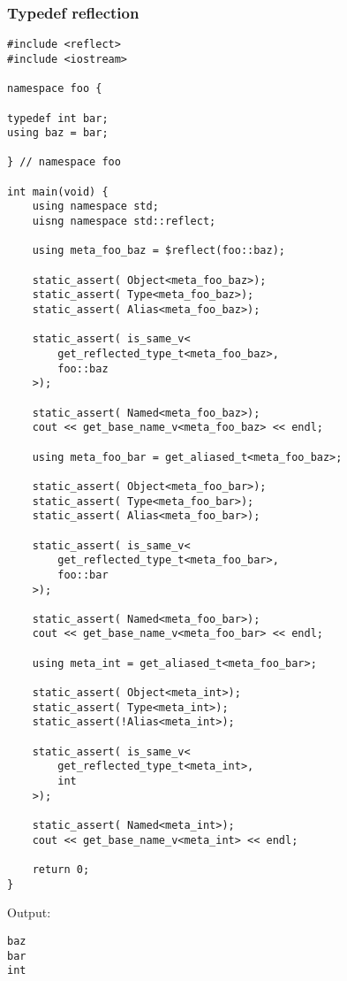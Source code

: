 \subsubsection{Typedef reflection}

\begin{verbatim}
#include <reflect>
#include <iostream>

namespace foo {

typedef int bar;
using baz = bar;

} // namespace foo

int main(void) {
	using namespace std;
	uisng namespace std::reflect;

	using meta_foo_baz = $reflect(foo::baz);

	static_assert( Object<meta_foo_baz>);
	static_assert( Type<meta_foo_baz>);
	static_assert( Alias<meta_foo_baz>);

	static_assert( is_same_v<
		get_reflected_type_t<meta_foo_baz>,
		foo::baz
	>);

	static_assert( Named<meta_foo_baz>);
	cout << get_base_name_v<meta_foo_baz> << endl;

	using meta_foo_bar = get_aliased_t<meta_foo_baz>;

	static_assert( Object<meta_foo_bar>);
	static_assert( Type<meta_foo_bar>);
	static_assert( Alias<meta_foo_bar>);

	static_assert( is_same_v<
		get_reflected_type_t<meta_foo_bar>,
		foo::bar
	>);

	static_assert( Named<meta_foo_bar>);
	cout << get_base_name_v<meta_foo_bar> << endl;

	using meta_int = get_aliased_t<meta_foo_bar>;

	static_assert( Object<meta_int>);
	static_assert( Type<meta_int>);
	static_assert(!Alias<meta_int>);

	static_assert( is_same_v<
		get_reflected_type_t<meta_int>,
		int
	>);

	static_assert( Named<meta_int>);
	cout << get_base_name_v<meta_int> << endl;

	return 0;
}

\end{verbatim}

Output:

\begin{verbatim}
baz
bar
int
\end{verbatim}

